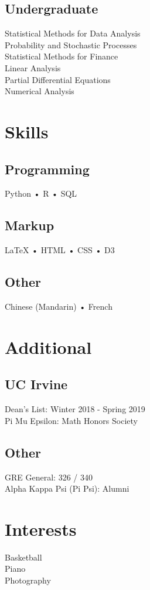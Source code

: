 \documentclass[]{deedy-resume-openfont}
\begin{document}
\begin{minipage}[t]{0.33\textwidth}
\subsection{Undergraduate} 
Statistical Methods for Data Analysis \\
Probability and Stochastic Processes \\
Statistical Methods for Finance \\
Linear Analysis \\
Partial Differential Equations \\
Numerical Analysis \\
\sectionsep


\section{Skills}
\subsection{Programming}
Python • R • SQL 
\subsection{Markup}
{\LaTeX} • HTML • CSS • D3
\subsection{Other}
Chinese (Mandarin) • French
\sectionsep


\section{Additional}
\subsection{UC Irvine}
Dean's List: Winter 2018 - Spring 2019 \\
Pi Mu Epsilon: Math Honors Society \\
\subsection{Other}
GRE General: 326 / 340 \\
Alpha Kappa Psi (Pi Psi): Alumni
\sectionsep

\section{Interests}
Basketball \\ Piano \\ Photography 
\sectionsep

%
%

\end{minipage} 
\end{document}
